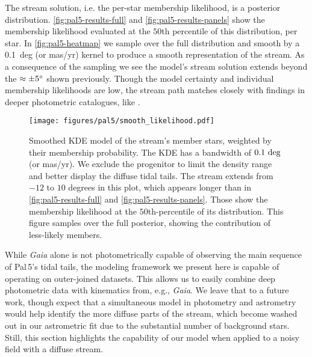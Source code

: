 \documentclass[twocolumn]{aastex631}
\newcommand{\stream}[1]{#1}
\newcommand{\dataarchive}[1]{\textit{#1}}
\newcommand{\Gaia}{\dataarchive{Gaia}}
\begin{document}
        The stream solution, i.e. the per-star membership likelihood, is a
        posterior distribution. \autoref{fig:pal5-results-full} and
        \autoref{fig:pal5-results-panels} show the membership likelihood
        evaluated at the $50$th percentile of this distribution, per star. In
        \autoref{fig:pal5-heatmap} we sample over the full distribution and
        smooth by a 0.1~deg (or mas/yr) kernel to produce a smooth
        representation of the stream. As a consequence of the sampling we see
        the model's stream solution extends beyond the $\approx \pm5\degree$
        shown previously.  Though the model certainty and individual membership
        likelihoods are low, the stream path matches closely with findings in
        deeper photometric catalogues, like \citet{Ibata+2017}.

        \begin{figure}[ht]
            \centering
            \hspace{-25pt}\texttt{[image: figures/pal5/smooth\_likelihood.pdf]}
            \caption{%
                Smoothed KDE model of the stream's member stars, weighted by
                their membership probability. The KDE has a bandwidth of $0.1 \
                \rm{deg}$ (or mas/yr). We exclude the progenitor to limit the
                density range and better display the diffuse tidal tails. The
                stream extends from $-12$ to $10$ degrees in this plot, which
                appears longer than in \autoref{fig:pal5-results-full} and
                \autoref{fig:pal5-results-panels}. Those show the membership
                likelihood at the $50$th-percentile of its distribution. This
                figure samples over the full posterior, showing the contribution
                of less-likely members.
            }
            \label{fig:pal5-heatmap}
        \end{figure}

        While \Gaia{} alone is not photometrically capable of observing the main
        sequence of \stream{Pal\,5}'s tidal tails, the modeling framework we
        present here is capable of operating on outer-joined datasets. This
        allows us to easily combine deep photometric data with kinematics from,
        e.g., \Gaia{}.  We leave that to a future work, though expect that a
        simultaneous model in photometry and astrometry would help identify the
        more diffuse parts of the stream, which become washed out in our
        astrometric fit due to the substantial number of background stars.
        Still, this section highlights the capability of our model when applied
        to a noisy field with a diffuse stream.
\end{document}
